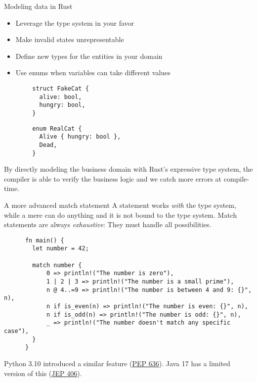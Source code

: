 \documentclass{beamer}
\begin{document}
\begin{frame}[fragile]{Modeling data in Rust}
  \begin{itemize}
    \item Leverage the type system in your favor
    \item Make invalid states unrepresentable
    \item Define new types for the entities in your domain
    \item Use enums when variables can take different values
  \end{itemize}

  \begin{multicols}{2}
    \begin{listing}
      \begin{verbatim}
        struct FakeCat {
          alive: bool,
          hungry: bool,
        }
      \end{verbatim}
    \end{listing}

    \begin{listing}
      \begin{verbatim}
        enum RealCat {
          Alive { hungry: bool },
          Dead,
        }
      \end{verbatim}
    \end{listing}
  \end{multicols}
  
  By directly modeling the business domain with Rust's expressive type system,
  the compiler is able to verify the business logic and
  we catch more errors at compile-time.
\end{frame}

\begin{frame}[fragile]{A more advanced match statement}
  A  statement works \emph{with} the type system,
  while a mere  can do anything and it is not bound to the type system.
  Match statements are always \emph{exhaustive}: They must handle all possibilities.

  \begin{listing}
    \begin{verbatim}
      fn main() {
        let number = 42;
    
        match number {
            0 => println!("The number is zero"),
            1 | 2 | 3 => println!("The number is a small prime"),
            n @ 4..=9 => println!("The number is between 4 and 9: {}", n),
            n if is_even(n) => println!("The number is even: {}", n),
            n if is_odd(n) => println!("The number is odd: {}", n),
            _ => println!("The number doesn't match any specific case"),
        }
      }
    \end{verbatim}
  \end{listing}

  Python 3.10 introduced a similar feature (\href{https://peps.python.org/pep-0636/}{PEP 636}).
  Java 17 has a limited version of this (\href{https://openjdk.org/jeps/406}{JEP 406}).
\end{frame}
\end{document}
